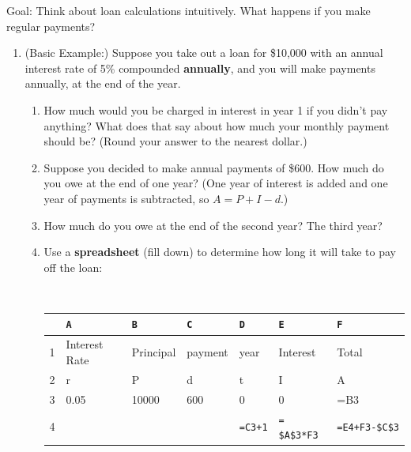 \documentclass[12pt]{article}
\renewcommand{\emph}[1]{\textsf{\textbf{#1}}}
\begin{document}
Goal: Think about loan calculations intuitively. What happens if you make regular payments?

\begin{enumerate}
\item  (Basic Example:) Suppose you take out a loan for \$10,000 with an annual interest rate of 5\% compounded \emph{annually}, and you will make payments annually, at the end of the year.
	\begin{enumerate}
	\item How much would you be charged in interest in year 1 if you didn't pay anything? What does that say about how much your monthly payment should be? (Round your answer to the nearest dollar.)
	\vfill
	\item Suppose you decided to make annual payments of \$600. How much do you owe at the end of one year? (One year of interest is added and one year of payments is subtracted, so $A = P + I - d$.)
	\vfill
	\item How much do you owe at the end of the second year? The third year?
	\vfill
	\item Use a \emph{spreadsheet} (fill down) to determine how long it will take to pay off the loan:
	
	{\tt
	\hspace{-1cm}\begin{tabularx}{\textwidth}{|l||X|X|X|X|X|X|}
	\hline
	 & \verb'A' 		& \verb'B' 	& \verb'C' 		& \verb'D' & \verb'E' & \verb'F'\\ \hline \hline
	1 & Interest Rate 	& Principal &  payment 		& year & Interest 		& Total \\ \hline
	2 &	r 				&P			& d				& t 		&I				&A		\\ \hline		
	3 & 0.05 			& 10000 	& 600 			& 0 		& 0				& =B3  \\ \hline
	4 & 				& 			& 				& \verb`=C3+1` 		&\verb'= $A$3*F3' &  \verb'=E4+F3-$C$3' \\ \hline 
	\end{tabularx}


}
\end{enumerate}
\end{enumerate}
\end{document}
